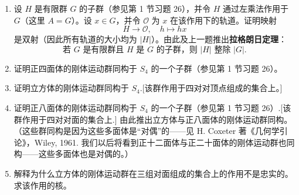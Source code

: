 \begin{enumerate}
\item 设 \( H \) 是有限群 \( G \) 的子群（参见第 1 节习题 26），并令 \( H \) 通过左乘法作用于 \( G \)（这里 \( A = G \)）。设 \( x \in G \)，并令 \( \mathcal{O} \) 为 \( x \) 在该作用下的轨道。证明映射
\[
H \to \mathcal{O},\quad h \mapsto hx
\]
是双射（因此所有轨道的大小均为 \( |H| \)）。由此及上一题推出\textbf{拉格朗日定理}：
\[
\text{若 } G \text{ 是有限群且 } H \text{ 是 } G \text{ 的子群，则 } |H| \text{ 整除 } |G|.
\]

\item 证明正四面体的刚体运动群同构于 \( S_4 \) 的一个子群（参见第 1 节习题 26）。

\item 证明立方体的刚体运动群同构于 \( S_4 \).[该群作用于四对对顶点组成的集合上。]

\item 证明正八面体的刚体运动群同构于 \( S_4 \) 的一个子群（参见第 1 节习题 26）.[该群作用于四对对面的集合上.] 由此推出立方体与正八面体的刚体运动群同构。（这些群同构是因为这些多面体是“对偶”的——见 H. Coxeter 著《几何学引论》，Wiley, 1961. 我们以后将看到正十二面体与正二十面体的刚体运动群也同构——这些多面体也是对偶的。）

\item 解释为什么立方体的刚体运动群在三组对面组成的集合上的作用不是忠实的。求该作用的核。

\end{enumerate}
